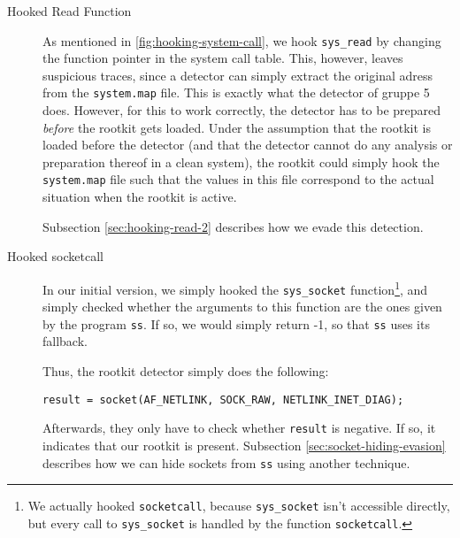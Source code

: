 \documentclass[10pt, letterpaper]{article}
\begin{document}
\begin{description}
\item[Hooked Read Function] As mentioned in \autoref{fig:hooking-system-call}, we hook \texttt{sys\_read} by changing the function pointer in the system call table. This, however, leaves suspicious traces, since a detector can simply extract the original adress from the \texttt{system.map} file. This is exactly what the detector of gruppe 5 does. However, for this to work correctly, the detector has to be prepared \textit{before} the rootkit gets loaded. Under the assumption that the rootkit is loaded before the detector (and that the detector cannot do any analysis or preparation thereof in a clean system), the rootkit could simply hook the \texttt{system.map} file such that the values in this file correspond to the actual situation when the rootkit is active.

Subsection \ref{sec:hooking-read-2} describes how we evade this detection.
\item[Hooked socketcall] In our initial version, we simply hooked the \texttt{sys\_socket} function\footnote{We actually hooked \texttt{socketcall}, because \texttt{sys\_socket} isn't accessible directly, but every call to \texttt{sys\_socket} is handled by the function \texttt{socketcall}.}, and simply checked whether the arguments to this function are the ones given by the program \texttt{ss}. If so, we would simply return -1, so that \texttt{ss} uses its fallback.

Thus, the rootkit detector simply does the following:

\begin{verbatim}
result = socket(AF_NETLINK, SOCK_RAW, NETLINK_INET_DIAG);
\end{verbatim}

Afterwards, they only have to check whether \texttt{result} is negative. If so, it indicates that our rootkit is present. Subsection \ref{sec:socket-hiding-evasion} describes how we can hide sockets from \texttt{ss} using another technique.


\end{description}
\end{document}
